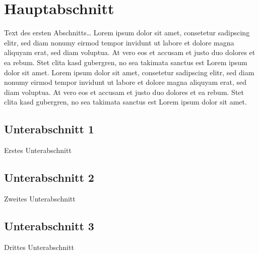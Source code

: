 \section{Hauptabschnitt}\label{hauptabschnitt}

Text des ersten Abschnitts\ldots{} Lorem ipsum dolor sit amet, consetetur sadipscing elitr, sed diam nonumy eirmod tempor invidunt ut labore et dolore magna aliquyam erat, sed diam voluptua. At vero eos et accusam et justo duo dolores et ea rebum. Stet clita kasd gubergren, no sea takimata sanctus est Lorem ipsum dolor sit amet. Lorem ipsum dolor sit amet, consetetur sadipscing elitr, sed diam nonumy eirmod tempor invidunt ut labore et dolore magna aliquyam erat, sed diam voluptua. At vero eos et accusam et justo duo dolores et ea rebum. Stet clita kasd gubergren, no sea takimata sanctus est Lorem ipsum dolor sit amet.

\subsection{Unterabschnitt 1}\label{unterabschnitt_1}

Erstes Unterabschnitt

\subsection{Unterabschnitt 2}\label{unterabschnitt_2}

Zweites Unterabschnitt

\subsection{Unterabschnitt 3}\label{unterabschnitt_3}

Drittes Unterabschnitt
